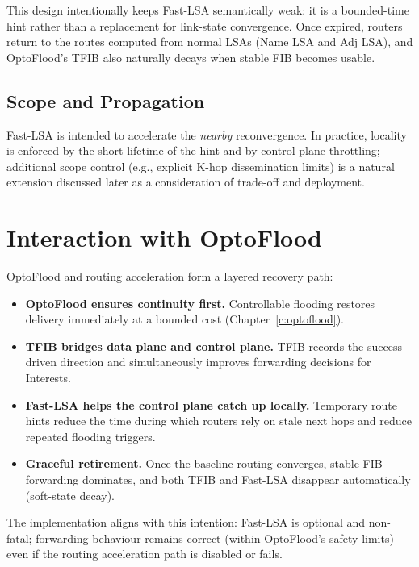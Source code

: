 This design intentionally keeps Fast-LSA semantically weak: it is a bounded-time hint rather than a replacement for link-state convergence. Once expired, routers return to the routes computed from normal LSAs (Name LSA and Adj LSA), and OptoFlood’s TFIB also naturally decays when stable FIB becomes usable.

\subsection{Scope and Propagation}
\label{sec:routingacc:fastlsa-scope}

Fast-LSA is intended to accelerate the \emph{nearby} reconvergence. In practice, locality is enforced by the short lifetime of the hint and by control-plane throttling; additional scope control (e.g., explicit K-hop dissemination limits) is a natural extension discussed later as a consideration of trade-off and deployment.

\section{Interaction with OptoFlood}
\label{sec:routingacc:interaction}

OptoFlood and routing acceleration form a layered recovery path:

\begin{itemize}
  \item \textbf{OptoFlood ensures continuity first.} Controllable flooding restores delivery immediately at a bounded cost (Chapter~\ref{c:optoflood}).
  \item \textbf{TFIB bridges data plane and control plane.} TFIB records the success-driven direction and simultaneously improves forwarding decisions for Interests.
  \item \textbf{Fast-LSA helps the control plane catch up locally.} Temporary route hints reduce the time during which routers rely on stale next hops and reduce repeated flooding triggers.
  \item \textbf{Graceful retirement.} Once the baseline routing converges, stable FIB forwarding dominates, and both TFIB and Fast-LSA disappear automatically (soft-state decay).
\end{itemize}

The implementation aligns with this intention: Fast-LSA is optional and non-fatal; forwarding behaviour remains correct (within OptoFlood’s safety limits) even if the routing acceleration path is disabled or fails.

